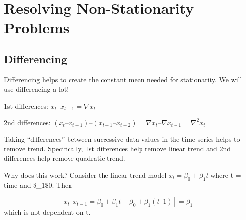 \documentclass[
]{book}
\theoremstyle{definition}
\theoremstyle{definition}
\theoremstyle{definition}
\theoremstyle{definition}
\theoremstyle{remark}
\begin{document}
\hypertarget{resolving-non-stationarity-problems}{%
\chapter{Resolving Non-Stationarity Problems}\label{resolving-non-stationarity-problems}}

\hypertarget{differencing}{%
\section{Differencing}\label{differencing}}

Differencing helps to create the constant mean needed for stationarity. We will use differencing a lot!

1st differences: \(x_t – x_{t-1} = \nabla x_t\)

2nd differences: \((x_t – x_{t-1}) – (x_{t-1} – x_{t-2}) = \nabla x_t – \nabla x_{t-1} = \nabla^2x_t\)

Taking ``differences'' between successive data values in the time series helps to remove trend. Specifically, 1st differences help remove linear trend and 2nd differences help remove quadratic trend.

Why does this work? Consider the linear trend model \(x_t = \beta_0 + \beta_1t\) where t = time and \$\beta\_1\ne\$0. Then

\[x_t – x_{t-1} =  \beta_0 + \beta_1t – [\beta_0 + \beta_1(t – 1)] = \beta_1\]
which is not dependent on t.
\end{document}
